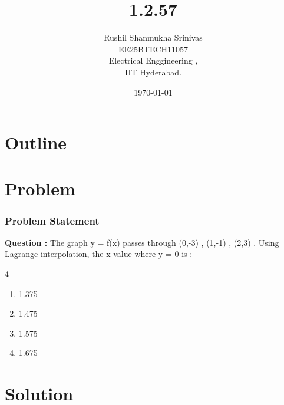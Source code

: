 \documentclass{beamer}
\title{1.2.57}
\author{Rushil Shanmukha Srinivas \\EE25BTECH11057 \\ Electrical Enggineering ,\\IIT Hyderabad.}
\date{\today}
\theoremstyle{remark}
\numberwithin{equation}{section}
\numberwithin{equation}{section}
\begin{document}
 

\begin{frame}
\titlepage
\end{frame}

\section*{Outline}
\begin{frame}
\tableofcontents
\end{frame}
\section{Problem}
\begin{frame}
\frametitle{Problem Statement}
\textbf{Question :}  The graph y = f(x) passes through (0,-3) , (1,-1) , (2,3) . Using Lagrange interpolation, the x-value where y = 0 is : 
\begin{multicols}{4}
\begin{enumerate}
\item 1.375
\item 1.475
\item 1.575
\item 1.675
\end{enumerate}
\end{multicols}
\end{frame}

\section{Solution}
\end{document}
